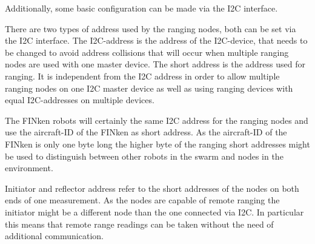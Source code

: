 Additionally, some basic configuration can be made via the I2C interface.

There are two types of address used by the ranging nodes, both can be set via the I2C interface.
The I2C-address is the address of the I2C-device, that needs to be changed to avoid address collisions that will occur when multiple ranging nodes are used with one master device.
The short address is the address used for ranging.
It is independent from the I2C address in order to allow multiple ranging nodes on one I2C master device as well as using ranging devices with equal I2C-addresses on multiple devices.

The FINken robots will certainly the same I2C address for the ranging nodes and use the aircraft-ID of the FINken as short address.
As the aircraft-ID of the FINken is only one byte long the higher byte of the ranging short addresses might be used to distinguish between other robots in the swarm and nodes in the environment.

Initiator and reflector address refer to the short addresses of the nodes on both ends of one measurement.
As the nodes are capable of remote ranging the initiator might be a different node than the one connected via I2C.
In particular this means that remote range readings can be taken without the need of additional communication.

